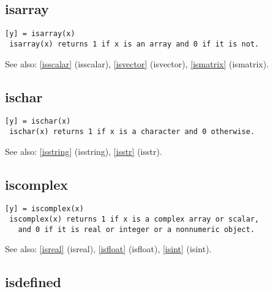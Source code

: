 \documentclass[a4paper]{article}
\begin{document}
\subsection{isarray\label{isarray}}

\begin{tscreen}
\begin{verbatim}
[y] = isarray(x)
 isarray(x) returns 1 if x is an array and 0 if it is not.
\end{verbatim}

See also: \ref{isscalar} {(isscalar)}, \ref{isvector} {(isvector)}, \ref{ismatrix} {(ismatrix)}.
\end{tscreen}





\subsection{ischar\label{ischar}}

\begin{tscreen}
\begin{verbatim}
[y] = ischar(x)
 ischar(x) returns 1 if x is a character and 0 otherwise.
\end{verbatim}

See also: \ref{isstring} {(isstring)}, \ref{isstr} {(isstr)}.
\end{tscreen}





\subsection{iscomplex\label{iscomplex}}

\begin{tscreen}
\begin{verbatim}
[y] = iscomplex(x)
 iscomplex(x) returns 1 if x is a complex array or scalar,
   and 0 if it is real or integer or a nonnumeric object.
\end{verbatim}

See also: \ref{isreal} {(isreal)}, \ref{isfloat} {(isfloat)}, \ref{isint} {(isint)}.
\end{tscreen}





\subsection{isdefined\label{isdefined}}
\end{document}
